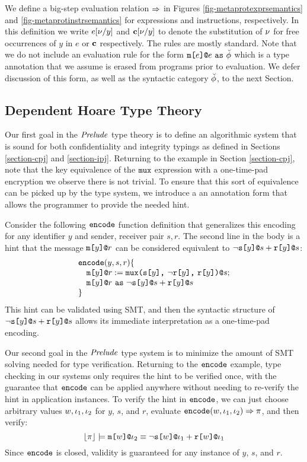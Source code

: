 We define a big-step evaluation relation $\Rightarrow$ in Figures
\ref{fig-metaprotexprsemantics} and \ref{fig-metaprotinstrsemantics}
for expressions and instructions, respectively.  In this definition we
write $e[\nu/y]$ and $\mathbf{c}[\nu/y]$ to denote the substitution of
$\nu$ for free occurrences of $y$ in $e$ or $\mathbf{c}$ respectively. The
rules are mostly standard. Note that we do not include an evaluation
rule for the form $\texttt{m[}e\texttt{]}\texttt{@}e\ \texttt{as}\ \breve{\phi}$ which is a type
annotation that we assume is erased from programs prior to
evaluation. We defer discussion of this form, as well as the syntactic
category $\breve{\phi}$, to the next Section.

\metaprotinstrsemanticsfig

\subsection{Dependent Hoare Type Theory}
\label{section-metalangty}

Our first goal in the $\mathit{Prelude}$ type theory is to define an
algorithmic system that is sound for both confidentiality and
integrity typings as defined in Sections \ref{section-cpj} and
\ref{section-ipj}. Returning to the example in Section
\ref{section-cpj}, note that the key equivalence of the $\texttt{mux}$
expression with a one-time-pad encryption we observe there
is not trivial. To ensure that this sort of equivalence
can be picked up by the type system, we introduce a
an annotation form that allows the programmer to provide
the needed hint.

Consider the following $\texttt{encode}$ function definition that
generalizes this encoding for any identifier $y$ and sender, receiver
pair $s,r$. The second line in the body is a hint that
the message $\texttt{m[}y\texttt{]}\texttt{@}r$ can be considered equivalent to
$\neg\texttt{s[}y\texttt{]}\texttt{@}s + \texttt{r[}y\texttt{]}\texttt{@}s$:
$$
\begin{array}{l}
\texttt{encode}(y,s,r) \{\\
\quad \texttt{m[}y\texttt{]}\texttt{@}r := \texttt{mux(} \texttt{s[}y\texttt{]} \texttt{,}\ \neg\texttt{r[}y\texttt{]} \texttt{,}\ \texttt{r[}y\texttt{]} \texttt{)}\texttt{@}s;\\
\quad \texttt{m[}y\texttt{]}\texttt{@}r\ \texttt{as}\ \neg\texttt{s[}y\texttt{]}\texttt{@}s + \texttt{r[}y\texttt{]}\texttt{@}s\\
\}
\end{array}
$$
This hint can be validated using SMT, and then the
syntactic structure of $\neg\texttt{s[}y\texttt{]}\texttt{@}s + \texttt{r[}y\texttt{]}\texttt{@}s$
allows its immediate interpretation as a one-time-pad encoding.

Our second goal in the $\mathit{Prelude}$ type system is to minimize the
amount of SMT solving needed for type verification.  Returning to the
$\texttt{encode}$ example, type checking in our systems only requires the
hint to be verified once, with the guarantee that $\texttt{encode}$ can
be applied anywhere without needing to re-verify the hint in
application instances. To verify the hint in $\texttt{encode}$, we can
just choose arbitrary values $w,\iota_1,\iota_2$ for $y$, $s$, and $r$,
evaluate $\texttt{encode}(w,\iota_1,\iota_2) \Rightarrow \pi$, and then verify:
$$\lfloor \pi \rfloor \models \texttt{m[}w\texttt{]}\texttt{@}\iota_2 \equiv
\neg\texttt{s[}w\texttt{]}\texttt{@}\iota_1 + \texttt{r[}w\texttt{]}\texttt{@}\iota_1$$ 
Since $\texttt{encode}$ is closed, validity is guaranteed for
any instance of $y$, $s$, and $r$.

